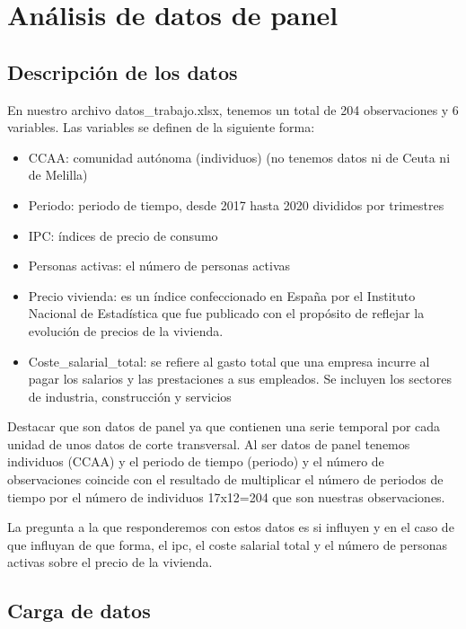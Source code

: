 \documentclass[
]{article}
\providecommand{\tightlist}{%
  \setlength{\itemsep}{0pt}\setlength{\parskip}{0pt}}
\begin{document}
\hypertarget{anuxe1lisis-de-datos-de-panel}{%
\section{Análisis de datos de
panel}\label{anuxe1lisis-de-datos-de-panel}}

\hypertarget{descripciuxf3n-de-los-datos}{%
\subsection{Descripción de los
datos}\label{descripciuxf3n-de-los-datos}}

En nuestro archivo datos\_trabajo.xlsx, tenemos un total de 204
observaciones y 6 variables. Las variables se definen de la siguiente
forma:

\begin{itemize}
\tightlist
\item
  CCAA: comunidad autónoma (individuos) (no tenemos datos ni de Ceuta ni
  de Melilla)
\item
  Periodo: periodo de tiempo, desde 2017 hasta 2020 divididos por
  trimestres
\item
  IPC: índices de precio de consumo
\item
  Personas activas: el número de personas activas
\item
  Precio vivienda: es un índice confeccionado en España por el Instituto
  Nacional de Estadística que fue publicado con el propósito de reflejar
  la evolución de precios de la vivienda.
\item
  Coste\_salarial\_total: se refiere al gasto total que una empresa
  incurre al pagar los salarios y las prestaciones a sus empleados. Se
  incluyen los sectores de industria, construcción y servicios
\end{itemize}

Destacar que son datos de panel ya que contienen una serie temporal por
cada unidad de unos datos de corte transversal. Al ser datos de panel
tenemos individuos (CCAA) y el periodo de tiempo (periodo) y el número
de observaciones coincide con el resultado de multiplicar el número de
periodos de tiempo por el número de individuos 17x12=204 que son
nuestras observaciones.

La pregunta a la que responderemos con estos datos es si influyen y en
el caso de que influyan de que forma, el ipc, el coste salarial total y
el número de personas activas sobre el precio de la vivienda.

\hypertarget{carga-de-datos}{%
\subsection{Carga de datos}\label{carga-de-datos}}
\end{document}
